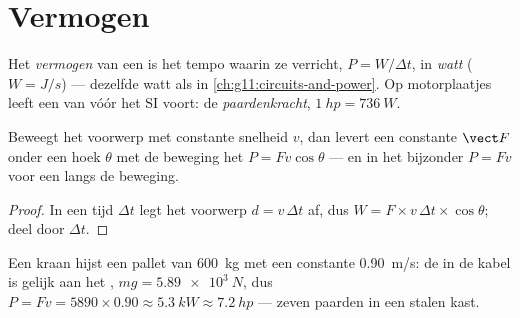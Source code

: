 \section{Vermogen}

\begin{definition}[Vermogen]\label{def:g11:work-of-force:power}
Het \emph{vermogen} van een  is het
tempo waarin ze  verricht, $P = W/\Delta t$, in
\emph{watt} ($\unit{W} = \unit{J/s}$) --- dezelfde watt als
in \cref{ch:g11:circuits-and-power}. Op motorplaatjes leeft een 
van vóór het SI voort: de \emph{paardenkracht},
$\qty{1}{hp} = \qty{736}{W}$.
\end{definition}

\begin{proposition}\label{prop:g11:work-of-force:pfv}
Beweegt het voorwerp met constante snelheid $v$, dan levert een constante
 $\vect F$ onder een hoek $\theta$ met de beweging het 
$P = F v \cos\theta$ --- en in het bijzonder $P = Fv$ voor een 
langs de beweging.
\end{proposition}

\begin{proof}
In een tijd $\Delta t$ legt het voorwerp $d = v\,\Delta t$ af, dus
$W = F \times v\,\Delta t \times \cos\theta$; deel door $\Delta t$.
\end{proof}

\begin{example}[Hijskraan]\label{ex:g11:work-of-force:crane}
Een kraan hijst een pallet van \qty{600}{kg} met een constante
\qty{0.90}{m/s}: de  in de kabel is gelijk aan het ,
$mg = \qty{5.89e3}{N}$, dus
$P = Fv = 5890 \times 0.90 \approx \qty{5.3}{kW} \approx \qty{7.2}{hp}$
--- zeven paarden in een stalen kast.
\end{example}

